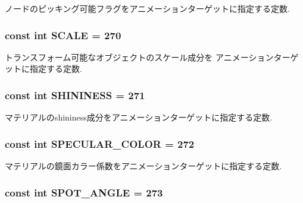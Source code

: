ノードのピッキング可能フラグをアニメーションターゲットに指定する定数. \hypertarget{classm3g_1_1AnimationTrack_8334f0c0c56b96debb10231b86050ead}{
\subsubsection[{SCALE}]{\setlength{\rightskip}{0pt plus 5cm}const int {\bf SCALE} = 270}}
\label{classm3g_1_1AnimationTrack_8334f0c0c56b96debb10231b86050ead}


トランスフォーム可能なオブジェクトのスケール成分を アニメーションターゲットに指定する定数. \hypertarget{classm3g_1_1AnimationTrack_f0b58ddb4173a8d2f5a730dab30e6c6f}{
\subsubsection[{SHININESS}]{\setlength{\rightskip}{0pt plus 5cm}const int {\bf SHININESS} = 271}}
\label{classm3g_1_1AnimationTrack_f0b58ddb4173a8d2f5a730dab30e6c6f}


マテリアルのshininess成分をアニメーションターゲットに指定する定数. \hypertarget{classm3g_1_1AnimationTrack_a0119030157ee8a5ef4f8ce88771447b}{
\subsubsection[{SPECULAR\_\-COLOR}]{\setlength{\rightskip}{0pt plus 5cm}const int {\bf SPECULAR\_\-COLOR} = 272}}
\label{classm3g_1_1AnimationTrack_a0119030157ee8a5ef4f8ce88771447b}


マテリアルの鏡面カラー係数をアニメーションターゲットに指定する定数. \hypertarget{classm3g_1_1AnimationTrack_c1d6b5313ef35ef100889ca885901db2}{
\subsubsection[{SPOT\_\-ANGLE}]{\setlength{\rightskip}{0pt plus 5cm}const int {\bf SPOT\_\-ANGLE} = 273}}
\label{classm3g_1_1AnimationTrack_c1d6b5313ef35ef100889ca885901db2}


